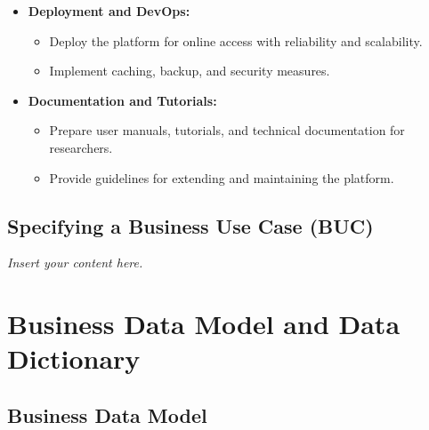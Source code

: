 \documentclass[12pt]{article}
\newcommand{\lips}{\textit{Insert your content here.}}
\begin{document}
\begin{itemize}
    \item \textbf{Deployment and DevOps:} 
        \begin{itemize}
            \item Deploy the platform for online access with reliability and scalability.
            \item Implement caching, backup, and security measures.
        \end{itemize}
        
    \item \textbf{Documentation and Tutorials:} 
        \begin{itemize}
            \item Prepare user manuals, tutorials, and technical documentation for researchers.
            \item Provide guidelines for extending and maintaining the platform.
        \end{itemize}
\end{itemize}



\subsection{Specifying a Business Use Case (BUC)}
\lips

\section{Business Data Model and Data Dictionary}
\subsection{Business Data Model}
\end{document}
